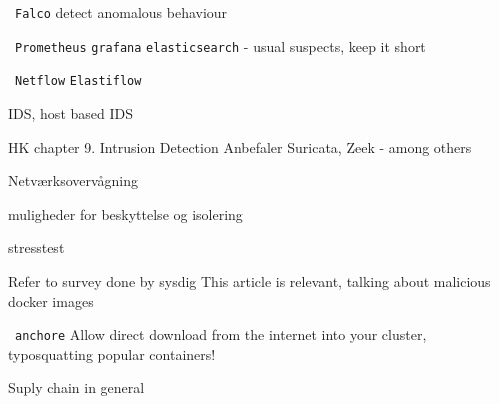 \documentclass[Screen16to9,17pt]{foils}
\begin{document}

\begin{list2}
\item \faWrench\ \verb+Falco+ detect anomalous behaviour
\item \faWrench\ \verb+Prometheus+ \verb+grafana+ \verb+elasticsearch+ - usual suspects, keep it short
\item \faWrench\ \verb+Netflow+ \verb+Elastiflow+
\end{list2}


\begin{list2}
\item IDS, host based IDS
\item HK chapter 9. Intrusion Detection
Anbefaler Suricata, Zeek - among others
\end{list2}



\begin{list2}
\item
\end{list2}


\begin{list2}
\item Netværksovervågning
\end{list2}


\begin{list2}
\item muligheder for beskyttelse og isolering
\end{list2}

\begin{list2}
\item stresstest
\end{list2}



Refer to survey done by sysdig
This article is relevant, talking about malicious docker images


\begin{list2}
\item \faWrench\ \verb+anchore+
Allow direct download from the internet into your cluster, typosquatting popular containers!

\item Suply chain in general
\end{list2}
\end{document}
